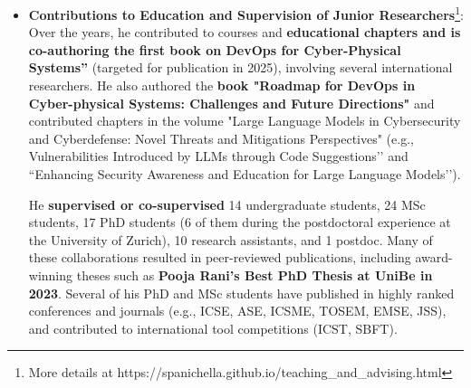 \documentclass[11pt]{article}
\begin{document}
\begin{itemize}
  \vspace{-2mm}
  \item 
  \textbf{Contributions to Education and Supervision of Junior Researchers}\footnote{More details at https://spanichella.github.io/teaching\_and\_advising.html}:  
Over the years, he contributed to courses and \textbf{educational chapters and is co-authoring the first book on DevOps for Cyber-Physical Systems''} (targeted for publication in 2025), involving several international researchers. He also authored the \textbf{book "Roadmap for DevOps in Cyber-physical Systems: Challenges and Future Directions"} and contributed chapters in the volume "Large Language Models in Cybersecurity and Cyberdefense: Novel Threats and Mitigations Perspectives" (e.g., Vulnerabilities Introduced by LLMs through Code Suggestions’’ and ``Enhancing Security Awareness and Education for Large Language Models’’). 

He \textbf{supervised or co-supervised} 14 undergraduate students, 24 MSc students, 17 PhD students (6 of them during the postdoctoral experience at the University of Zurich), 10 research assistants, and 1 postdoc. Many of these collaborations resulted in peer-reviewed publications, including award-winning theses such as \textbf{Pooja Rani’s Best PhD Thesis at UniBe in 2023}. Several of his PhD and MSc students have published in highly ranked conferences and journals (e.g., ICSE, ASE, ICSME, TOSEM, EMSE, JSS), and contributed to international tool competitions (ICST, SBFT). 


\end{itemize}
\end{document}
